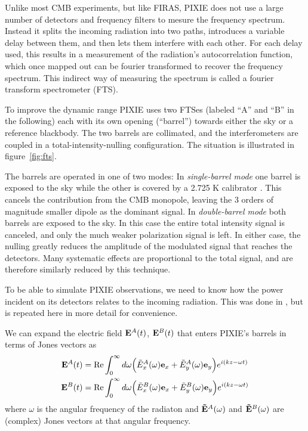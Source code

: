 \documentclass{article}
\renewcommand{\Re}{\operatorname{Re}}
\newcommand{\J}{{\tilde E}}
\renewcommand{\vec}[1]{{\bf #1}}
\begin{document}
Unlike most CMB experiments, but like FIRAS, PIXIE does not use a
large number of detectors and frequency filters to mesure the
frequency spectrum. Instead it splits the incoming radiation into
two paths, introduces a variable delay between them, and then lets them
interfere with each other. For each delay used, this results in
a measurement of the radiation's autocorrelation function, which
once mapped out can be fourier transformed to recover the frequency
spectrum. This indirect way of measuring the spectrum is called
a fourier transform spectrometer (FTS).

To improve the dynamic
range PIXIE uses two FTSes (labeled ``A'' and ``B'' in the following)
each with its own opening (``barrel'') towards either the sky or a
reference blackbody. The two barrels are collimated, and the
interferometers are coupled in a total-intensity-nulling configuration.
The situation is illustrated in figure~\ref{fig:fts}.

The barrels are operated in one of two modes:
In \emph{single-barrel mode} one barrel is
exposed to the sky while the other is covered by a 2.725 K calibrator
\citep{pixie2011}.
This cancels the contribution from the CMB monopole, leaving the
3 orders of magnitude smaller dipole as the dominant signal.
In \emph{double-barrel mode} both barrels are exposed to the sky.
In this case the entire total intensity signal is canceled, and
only the much weaker polarization signal is left.
In either case, the nulling greatly reduces the amplitude of the
modulated signal that reaches the detectors. Many systematic effects
are proportional to the total signal, and are therefore similarly
reduced by this technique.

To be able to simulate PIXIE observations, we need to know how
the power incident on its detectors relates to the incoming radiation.
This was done in \cite{pixie2011}, but is repeated here in more detail
for convenience.

We can expand the electric field $\vec E^A(t)$,
$\vec E^B(t)$ that enters PIXIE's barrels in terms of Jones vectors as
\begin{align}
	\vec E^A(t) &= \Re \int_0^\infty d\omega \Big(\J^A_x(\omega)\vec e_x +
		\J^A_y(\omega)\vec e_y\Big) e^{i(kz-\omega t)} \notag \\
	\vec E^B(t) &= \Re \int_0^\infty d\omega \Big(\J^B_x(\omega)\vec e_x +
		\J^B_y(\omega)\vec e_y\Big) e^{i(kz-\omega t)}
\end{align}
where $\omega$ is the angular frequency of the radiaton and $\vec \J^A(\omega)$
and $\vec \J^B(\omega)$ are (complex) Jones vectors at that
angular frequency.
\end{document}

